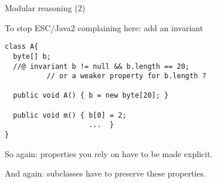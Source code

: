 \documentclass[
pdf,
nocolorBG,
slideColor,
erik,
]{prosper}
\begin{document}
\begin{slide}{Modular reasoning (2)}
\vspace*{-3ex}

To stop ESC/Java2 complaining here: add an invariant

\begin{verbatim}
class A{
  byte[] b;
  //@ invariant b != null && b.length == 20;
          // or a weaker property for b.length ?

  public void A() { b = new byte[20]; }

  public void m() { b[0] = 2;
                    ...  }
}
\end{verbatim}


So again: properties you rely on have to be made explicit.

And again: subclasses have to preserve these properties.

\end{slide}
\end{document}
